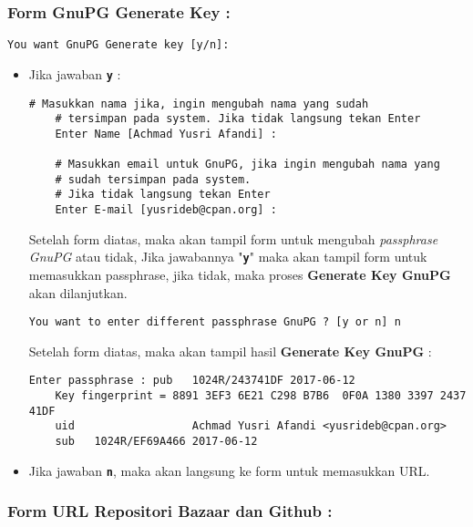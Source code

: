 {\subsubsection{Form GnuPG Generate Key :}

\begin{lstlisting}[language=ShellBash]
You want GnuPG Generate key [y/n]: 
\end{lstlisting}

\begin{itemize}
	\item Jika jawaban \textbf{\texttt{y}} :
	\begin{lstlisting}[language=ShellBash]
	# Masukkan nama jika, ingin mengubah nama yang sudah
	# tersimpan pada system. Jika tidak langsung tekan Enter
	Enter Name [Achmad Yusri Afandi] : 
	
	# Masukkan email untuk GnuPG, jika ingin mengubah nama yang
	# sudah tersimpan pada system. 
	# Jika tidak langsung tekan Enter
	Enter E-mail [yusrideb@cpan.org] : 
	\end{lstlisting}
	
	Setelah form diatas, maka akan tampil form untuk mengubah \textit{passphrase GnuPG} atau tidak, Jika jawabannya "\texttt{\textbf{y}}" maka akan tampil form untuk memasukkan passphrase, jika tidak, maka proses \textbf{Generate Key GnuPG} akan dilanjutkan.
	
	\begin{lstlisting}[language=ShellBash]
	You want to enter different passphrase GnuPG ? [y or n] n
	\end{lstlisting}
	
	\noindent
	Setelah form diatas, maka akan tampil hasil \textbf{Generate Key GnuPG} :
	
	\begin{lstlisting}[language=ShellBash2]
	Enter passphrase : pub   1024R/243741DF 2017-06-12
	Key fingerprint = 8891 3EF3 6E21 C298 B7B6  0F0A 1380 3397 2437 41DF
	uid                  Achmad Yusri Afandi <yusrideb@cpan.org>
	sub   1024R/EF69A466 2017-06-12
	\end{lstlisting}
	
	\item Jika jawaban \textbf{\texttt{n}}, maka akan langsung ke form untuk memasukkan URL.
	
\end{itemize}

\pagebreak
\subsubsection{Form URL Repositori Bazaar dan Github :}

}
